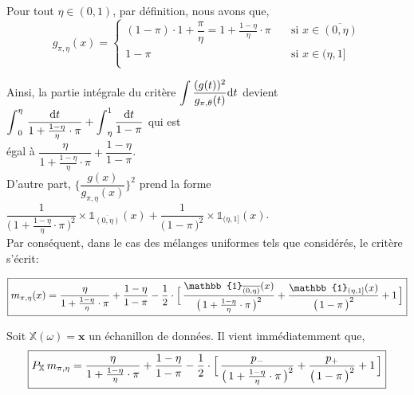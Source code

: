 \documentclass{article}
\begin{document}
    Pour tout $\eta\in(0,1)$, par définition, nous avons que,
    $$
    g_{\pi,\eta}(x)          =
    \left\{
        \begin{array}{ll}
            (1-\pi)\cdot{}1 + \dfrac{\pi}{\eta} = 1 + \frac{1-\eta}{\eta}\cdot\pi  & \quad\mbox{si } x\in\overline{(0,\eta)} \\
            1-\pi                 & \quad\mbox{si } x\in(\eta,1] \\
        \end{array}
    \right. 
    $$
    
    \vspace*{0.3cm}
    Ainsi, la partie intégrale du critère $\mathop{\mathlarger{\int}} \dfrac{(g(t))^2}{g_{\pi,\theta}(t)}\mathrm{d}t$ devient $\mathop{\mathlarger{\int}}_0^\eta\, \dfrac{\mathrm{d}t}{1+\frac{1-\eta}{\eta}\cdot\pi} + \mathop{\mathlarger{\int}}_\eta^1\dfrac{\mathrm{d}t}{1-\pi}$ qui est \\ égal à $\dfrac{\eta}{1+\frac{1-\eta}{\eta}\cdot\pi} + \dfrac{1-\eta}{1-\pi}$. \\

    \vspace*{0.3cm}
    D'autre part, $\big\{ \dfrac{g(x)}{g_{\pi,\eta}(x)} \big\}^2$ prend la forme $\dfrac{1}{\big(\,1+\frac{1-\eta}{\eta}\cdot\pi\,\big)^2}\times\mathbb{1}_{\overline{(0,\eta)}}(x) + \dfrac{1}{\big(\,1-\pi\,\big)^2}\times\mathbb{1}_{(\eta,1]}(x)$. \\

    \vspace*{0.5cm}
    Par conséquent, dans le cas des mélanges uniformes tels que considérés, le critère s'écrit:

    $$ \fbox{$m_{\pi,\eta}(x) = \dfrac{\eta}{1+\frac{1-\eta}{\eta}\cdot\pi} + \dfrac{1-\eta}{1-\pi} - \dfrac{1}{2}\cdot\Big[\, \dfrac{\mathbb{1}_{\overline{(0,\eta)}}(x)}{\big(\,1+\frac{1-\eta}{\eta}\cdot\pi\,\big)^2} + \dfrac{\mathbb{1}_{(\eta,1]}(x)}{\big(\,1-\pi\,\big)^2} + 1 \,\Big]$}$$

    \vspace*{0.5cm}
    Soit $\mathbb{X}(\omega)=\mathbf{x}$ un échanillon de données. Il vient immédiatemment que,
    \vspace*{0.2cm}
    $$ \fbox{$P_\mathbb{X}\,m_{\pi,\eta} = \dfrac{\eta}{1+\frac{1-\eta}{\eta}\cdot\pi} + \dfrac{1-\eta}{1-\pi} - \dfrac{1}{2}\cdot\Big[\, \dfrac{p_-}{\big(\,1+\frac{1-\eta}{\eta}\cdot\pi\,\big)^2} + \dfrac{p_+}{\big(\,1-\pi\,\big)^2} + 1 \,\Big]$} $$
    
\end{document}
